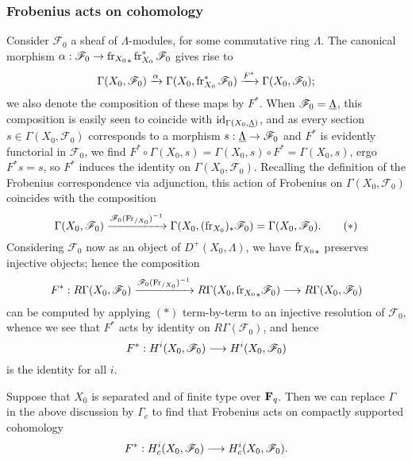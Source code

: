 \documentclass[deligne.tex]{subfiles}
\begin{document}
\subsubsection{Frobenius acts on cohomology}
Consider $\mathscr F_0$ a sheaf of $\Lambda$-modules, for some commutative ring $\Lambda$.
The canonical morphism $\alpha:\mathscr F_0\rightarrow{\operatorname{fr}_{X_0}}_\ast\operatorname{fr}_{X_0}^\ast\mathscr F_0$
gives rise to
\begin{equation*}
    \Gamma(X_0,\mathscr F_0)\xrightarrow{\alpha}\Gamma(X_0,\operatorname{fr}_{X_0}^\ast\mathscr F_0)
    \xrightarrow{F^\ast}\Gamma(X_0,\mathscr F_0);
\end{equation*}
we also denote the composition of these maps by $F^\ast$.
When $\mathscr F_0=\underline{\Lambda}$, this composition is easily seen to coincide with
$\operatorname{id}_{\Gamma(X_0,\underline{\Lambda})}$,
and as every section $s\in\Gamma(X_0,\mathscr F_0)$ corresponds to a morphism
$s:\underline{\Lambda}\rightarrow\mathscr F_0$ and $F^\ast$ is evidently functorial in $\mathscr F_0$,
we find $F^\ast\circ\Gamma(X_0,s)=\Gamma(X_0,s)\circ F^\ast=\Gamma(X_0,s)$, ergo
$F^\ast s=s$, so $F^\ast$ induces the identity on ${\Gamma(X_0,\mathscr F_0)}$.
Recalling the definition of the Frobenius correspondence via adjunction, this action of Frobenius on $\Gamma(X_0,\mathscr F_0)$ coincides with the composition
\begin{equation*}
    \Gamma(X_0,\mathscr F_0)\xrightarrow{\mathscr F_0(\operatorname{Fr}_{/X_0})^{-1}}
    \Gamma(X_0,(\operatorname{fr}_{X_0})_\ast\mathscr F_0)=\Gamma(X_0,\mathscr F_0).\tag{$\ast$}
\end{equation*}
Considering $\mathscr F_0$ now as an object of $D^+(X_0,\Lambda)$, we have 
${\operatorname{fr}_{X_0}}_\ast$ preserves injective objects; hence the composition
\begin{equation*}
    F^\ast:R\Gamma(X_0,\mathscr F_0)\xrightarrow{\mathscr F_0(\operatorname{Fr}_{/X_0})^{-1}} R\Gamma(X_0,{\operatorname{fr}_{X_0}}_\ast\mathscr F_0)\longrightarrow R\Gamma(X_0,\mathscr F_0)
\end{equation*}
can be computed by applying $(\ast)$ term-by-term to an injective resolution of
$\mathscr F_0$, whence we see that $F^\ast$ acts by identity on $R\Gamma(\mathscr F_0)$,
and hence
\begin{equation*}
    F^\ast:H^i(X_0,\mathscr F_0)\longrightarrow H^i(X_0,\mathscr F_0)
\end{equation*}
is the identity for all $i$.

Suppose that $X_0$ is separated and of finite type over $\mathbf{F}_q$.
Then we can replace $\Gamma$ in the above discussion by $\Gamma_c$ to find that
Frobenius acts on compactly supported cohomology
\begin{equation*}
    F^\ast : H_c^i(X_0,\mathscr F_0)\longrightarrow H_c^i(X_0,\mathscr F_0).
\end{equation*}
\end{document}
